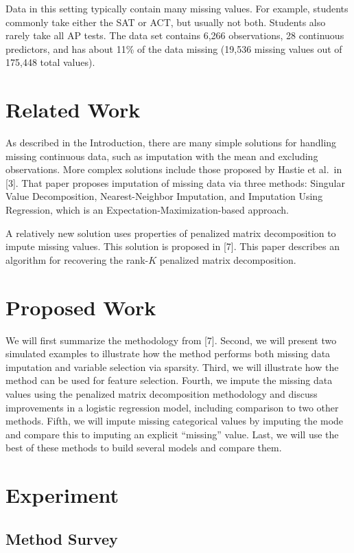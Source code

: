 \documentclass{article}
\begin{document}
Data in this setting typically contain many missing values.  For example, students commonly take either the SAT or ACT, but usually not both.  Students also rarely take all AP tests.  The data set contains 6,266 observations, 28 continuous predictors, and has about 11\% of the data missing (19,536 missing values out of 175,448 total values).

\section{Related Work}

As described in the Introduction, there are many simple solutions for handling missing continuous data, such as imputation with the mean and excluding observations.  More complex solutions include those proposed by Hastie et al.~in [3].  That paper proposes imputation of missing data via three methods: Singular Value Decomposition, Nearest-Neighbor Imputation, and Imputation Using Regression, which is an Expectation-Maximization-based approach.

A relatively new solution uses properties of penalized matrix decomposition to impute missing values.  This solution is proposed in [7].  This paper describes an algorithm for recovering the rank-$K$ penalized matrix decomposition.

\section{Proposed Work}

We will first summarize the methodology from [7].  Second, we will present two simulated examples to illustrate how the method performs both missing data imputation and variable selection via sparsity.  Third, we will illustrate how the method can be used for feature selection.  Fourth, we impute the missing data values using the penalized matrix decomposition methodology and discuss improvements in a logistic regression model, including comparison to two other methods.  Fifth, we will impute missing categorical values by imputing the mode and compare this to imputing an explicit ``missing'' value.  Last, we will use the best of these methods to build several models and compare them.

\section{Experiment}

\subsection{Method Survey}
\end{document}
